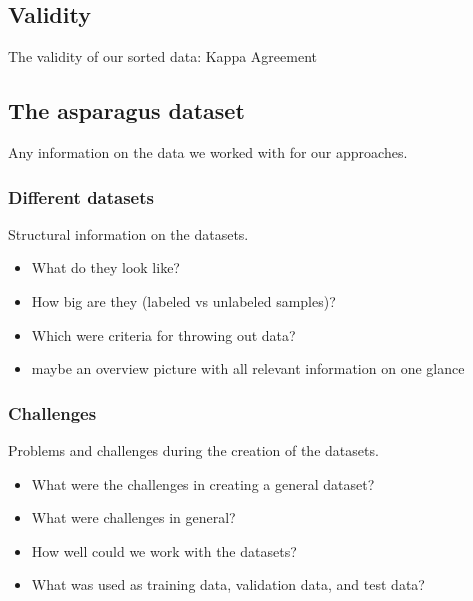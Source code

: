 \subsection{Validity}

The validity of our sorted data: Kappa Agreement


\subsection{The asparagus dataset}

Any information on the data we worked with for our approaches.


\subsubsection{Different datasets}

Structural information on the datasets.

\begin{itemize}
\item What do they look like?
\item How big are they (labeled vs unlabeled samples)?
\item Which were criteria for throwing out data?
\item maybe an overview picture with all relevant information on one glance
\end{itemize}


\subsubsection{Challenges}

Problems and challenges during the creation of the datasets.

\begin{itemize}
\item What were the challenges in creating a general dataset?
\item What were challenges in general?
\item How well could we work with the datasets?
\item What was used as training data, validation data, and test data?
\end{itemize}
